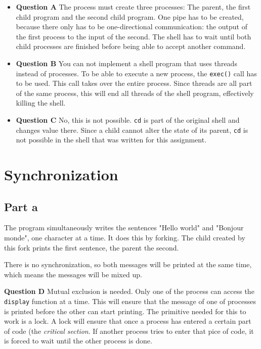 \documentclass[a4paper]{article}
\begin{document}
\begin{itemize}
    \item \textbf{Question A} The process must create three processes: The parent, the 
            first child program and the second child program. One pipe has to be created,
            because there only has to be one-directional communication: the output of the
            first process to the input of the second. The shell has to wait until both
            child processes are finished before being able to accept another command.
    \item \textbf{Question B} You can not implement a shell program that uses threads
            instead of processes. To be able to execute a new process, the \texttt{exec()}
            call has to be used. This call takes over the entire process. Since threads
            are all part of the same process, this will end all threads of the shell 
            program, effectively killing the shell.
    \item \textbf{Question C} No, this is not possible. \texttt{cd} is part of the 
            original shell and changes value there. Since a child cannot alter the state
            of its parent, \texttt{cd} is not possible in the shell that was written for 
            this assignment.
\end{itemize}

\section{Synchronization}

\subsection{Part a}

The program simultaneously writes the sentences "Hello world" and "Bonjour monde", one
character at a time. It does this by forking. The child created by this fork prints the
first sentence, the parent the second.

There is no synchronization, so both messages will be printed at the same time, which
means the messages will be mixed up.

\textbf{Question D} Mutual exclusion is needed. Only one of the process can access the
\texttt{display} function at a time. This will ensure that the message of one of processes
is printed before the other can start printing. The primitive needed for this to work is a
lock. A lock will ensure that once a process has entered a certain part of code (the
\emph{critical section}. If another process tries to enter that pice of code, it is forced
to wait until the other process is done.
\end{document}
